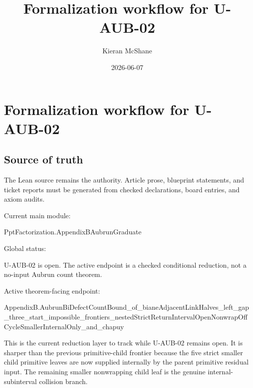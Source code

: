 \documentclass[
]{article}
\title{Formalization workflow for U-AUB-02}
\author{Kieran McShane}
\date{2026-06-07}
\newenvironment{Shaded}{}{}
\newcommand{\NormalTok}[1]{#1}
\begin{document}
\maketitle

\section{Formalization workflow for
U-AUB-02}\label{formalization-workflow-for-u-aub-02}

\subsection{Source of truth}\label{source-of-truth}

The Lean source remains the authority. Article prose, blueprint
statements, and ticket reports must be generated from checked
declarations, board entries, and axiom audits.

Current main module:

\begin{Shaded}
\begin{Highlighting}[]
\NormalTok{PptFactorization.AppendixBAubrunGraduate}
\end{Highlighting}
\end{Shaded}

Global status:

\begin{Shaded}
\begin{Highlighting}[]
\NormalTok{U{-}AUB{-}02 is open.  The active endpoint is a checked conditional reduction,}
\NormalTok{not a no{-}input Aubrun count theorem.}
\end{Highlighting}
\end{Shaded}

Active theorem-facing endpoint:

\begin{Shaded}
\begin{Highlighting}[]
\NormalTok{AppendixB.AubrunBiDefectCountBound\_of\_bianeAdjacentLinkHalves\_left\_gap\_three\_start\_impossible\_frontiers\_nestedStrictReturnIntervalOpenNonwrapOffCycleSmallerInternalOnly\_and\_chapuy}
\end{Highlighting}
\end{Shaded}

This is the current reduction layer to track while U-AUB-02 remains
open. It is sharper than the previous primitive-child frontier because
the five strict smaller child primitive leaves are now supplied
internally by the parent primitive residual input. The remaining smaller
nonwrapping child leaf is the genuine internal-subinterval collision
branch.
\end{document}
